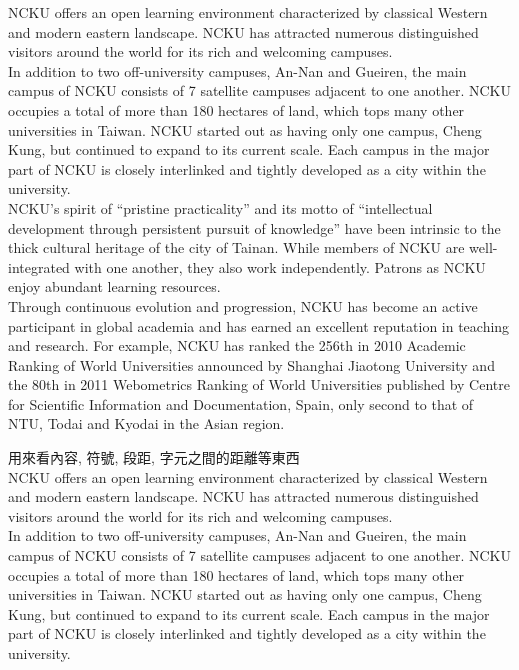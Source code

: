 NCKU offers an open learning environment characterized by classical Western and modern eastern landscape. NCKU has attracted numerous distinguished visitors around the world for its rich and welcoming campuses.\\
In addition to two off-university campuses, An-Nan and Gueiren, the main campus of NCKU consists of 7 satellite campuses adjacent to one another. NCKU occupies a total of more than 180 hectares of land, which tops many other universities in Taiwan. NCKU started out as having only one campus, Cheng Kung, but continued to expand to its current scale. Each campus in the major part of NCKU is closely interlinked and tightly developed as a city within the university.\\
NCKU's spirit of ``pristine practicality'' and its motto of ``intellectual development through persistent pursuit of knowledge'' have been intrinsic to the thick cultural heritage of the city of Tainan. While members of NCKU are well-integrated with one another, they also work independently. Patrons as NCKU enjoy abundant learning resources.\\
Through continuous evolution and progression, NCKU has become an active participant in global academia and has earned an excellent reputation in teaching and research. For example, NCKU has ranked the 256th in 2010 Academic Ranking of World Universities announced by Shanghai Jiaotong University and the 80th in 2011 Webometrics Ranking of World Universities published by Centre for Scientific Information and Documentation, Spain, only second to that of NTU, Todai and Kyodai in the Asian region.


\newpage
{}
用來看內容, 符號, 段距, 字元之間的距離等東西\\

NCKU offers an open learning environment characterized by classical Western and modern eastern landscape. NCKU has attracted numerous distinguished visitors around the world for its rich and welcoming campuses.\\

In addition to two off-university campuses, An-Nan and Gueiren, the main campus of NCKU consists of 7 satellite campuses adjacent to one another. NCKU occupies a total of more than 180 hectares of land, which tops many other universities in Taiwan. NCKU started out as having only one campus, Cheng Kung, but continued to expand to its current scale. Each campus in the major part of NCKU is closely interlinked and tightly developed as a city within the university.\\


